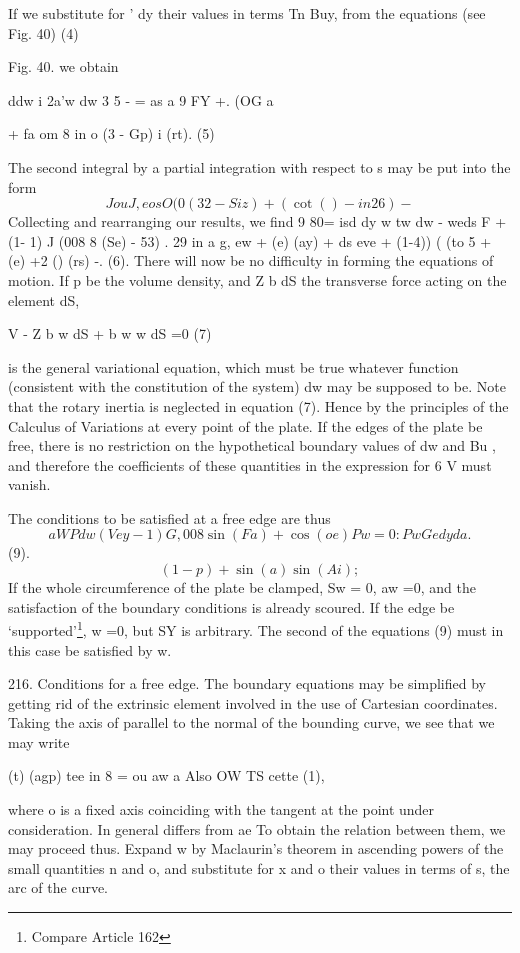 If we substitute for ' dy their values in terms Tn Buy, from the
equations (see Fig. 40) (4)

Fig. 40.
we obtain

ddw i 2a'w dw 3 5 - = as a 9 FY +. (OG a

+ fa om 8 in o (3 - Gp) i (rt). (5)

The second integral by a partial integration with respect to s may be
put into the form
\[ Jou J, eos O (0 (32 - Siz) + ( \cot() - in 2 6) - \]
Collecting and rearranging our results, we find 9 80= isd dy w tw dw -
weds F +(1- 1) J (008 8 (Se) - 53) . 29 in a g, ew + (e) (ay) + ds eve +
(1-4)) ( (to 5 + (e) +2 () (rs) -. (6). There will now be no difficulty
in forming the equations of
motion. If p be the volume density, and Z b dS the transverse force
acting on the element dS,

V - Z b w dS + b w w dS =0 (7)

is the general variational equation, which must be true whatever
function (consistent with the constitution of the system) dw may be
supposed to be. Note that the rotary inertia is neglected in equation
(7). Hence by the principles of the Calculus of Variations
at every point of the plate. If the edges of the plate be free, there is
no restriction on the
hypothetical boundary values of dw and Bu , and therefore the
coefficients of these quantities in the expression for 6 V must vanish.

The conditions to be satisfied at a free edge are thus
\[a W P dw (Vey - 1) G, 008 \sin(Fa) +  \cos(oe) Pw  =0 : Pw Ge dy da.\]
(9).
\[(1-p) + \sin(a)  \sin(Ai);\]
If the whole circumference of the plate be clamped, Sw = 0, aw =0,
and the satisfaction of the boundary conditions is already scoured. If
the edge be `supported'\footnote{Compare Article 162}, w =0, but SY is
arbitrary. The second of the equations (9) must in this case be satisfied by w.

216. Conditions for a free edge.
The boundary equations may be simplified by getting rid of the
extrinsic element involved in the use of Cartesian coordinates. Taking
the axis of parallel to the normal of the bounding curve, we see that we
may write

(t) (agp) tee in 8 = ou aw a Also OW TS cette (1),

where o is a fixed axis coinciding with the tangent at the point under
consideration. In general differs from ae To obtain the relation between
them, we may proceed thus. Expand w by Maclaurin's theorem in ascending
powers of the small quantities n and o, and substitute for x and o their
values in terms of s, the arc of the curve.

